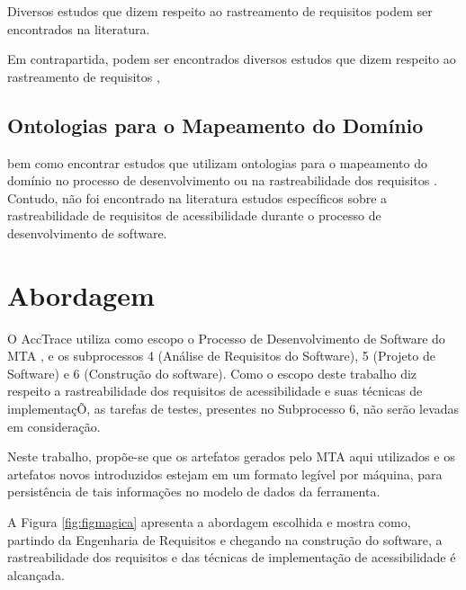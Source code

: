 \documentclass[runningheads,a4paper]{llncs}
\begin{document}
Diversos estudos que dizem respeito ao rastreamento de requisitos podem ser
encontrados na literatura.

 Em contrapartida, podem ser encontrados diversos
estudos que dizem respeito ao rastreamento de requisitos
\cite{5970169,292398,5485417,6405269}, 

\subsection{Ontologias para o Mapeamento do Domínio}

bem como encontrar estudos que utilizam
ontologias para o mapeamento do domínio no processo de desenvolvimento ou na
rastreabilidade dos requisitos \cite{5223183,6511842,4148940,5362244}. Contudo,
não foi encontrado na literatura estudos específicos sobre a rastreabilidade de
requisitos de acessibilidade durante o processo de desenvolvimento de software.

\section{Abordagem}

O AccTrace utiliza como escopo o Processo de Desenvolvimento de Software do MTA
\cite{maia:10}, e os subprocessos 4 (Análise de Requisitos do Software), 5
(Projeto de Software) e 6 (Construção do software). Como o escopo deste trabalho
diz respeito a rastreabilidade dos requisitos de acessibilidade e suas técnicas
de implementaçÕ, as tarefas de testes, presentes no Subprocesso 6, não serão
levadas em consideração. 

Neste trabalho, propõe-se que os artefatos gerados pelo MTA aqui utilizados e os
artefatos novos introduzidos estejam em um formato legível por máquina, para
persistência de tais informações no modelo de dados da ferramenta.

A Figura \ref{fig:figmagica} apresenta a abordagem escolhida e mostra como,
partindo da Engenharia de Requisitos e chegando na construção do software,
a rastreabilidade dos requisitos e das técnicas de implementação de
acessibilidade é alcançada.
\end{document}
